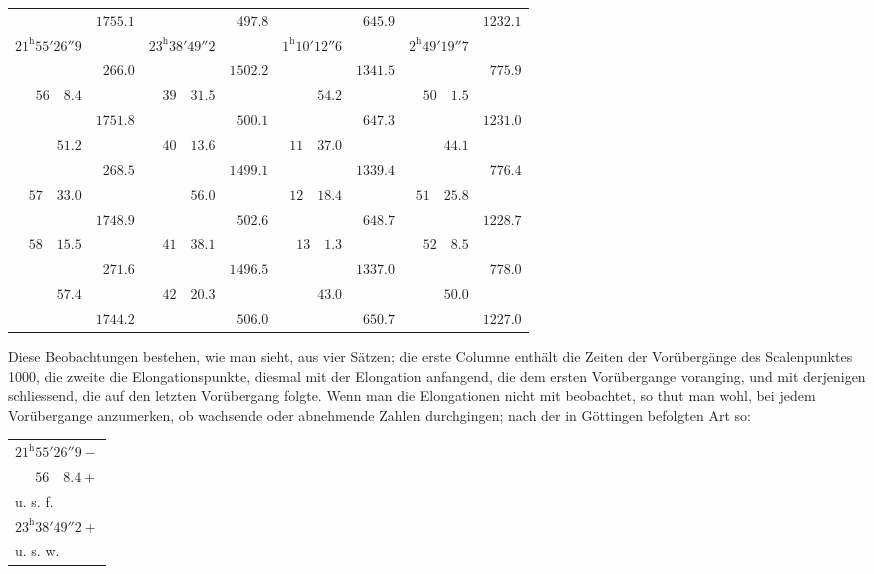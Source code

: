 \begin{center}
\begingroup\fontsize{9}{11}\selectfont\setlength{\tabcolsep}{2pt}
\begin{tabular}{r|r||r|r||r|r||r|r}
& $1755.1$ && $497.8$ && $645.9$ && $1232.1$ \\[-4pt]
$21^{\mathrm{h}}55'26''9$ && $23^{\mathrm{h}}38'49''2$ && $1^{\mathrm{h}}10'12''6$ && $2^{\mathrm{h}}49'19''7$ & \\[-4pt]
& $266.0$ && $1502.2$ && $1341.5$ && $775.9$ \\[-4pt]
$56\quad8.4$ && $39\quad31.5$ && $54.2$ && $50\quad1.5$ & \\[-4pt]
& $1751.8$ && $500.1$ && $647.3$ && $1231.0$ \\[-4pt]
$51.2$ && $40\quad13.6$ && $11\quad37.0$ && $44.1$ & \\[-4pt]
& $268.5$ && $1499.1$ && $1339.4$ && $776.4$ \\[-4pt]
$57\quad33.0$ && $56.0$ && $12\quad18.4$ && $51\quad25.8$ & \\[-4pt]
& $1748.9$ && $502.6$ && $648.7$ && $1228.7$ \\[-4pt]
$58\quad15.5$ && $41\quad38.1$ && $13\quad1.3$ && $52\quad8.5$ & \\[-4pt]
& $271.6$ && $1496.5$ && $1337.0$ && $778.0$ \\[-4pt]
$57.4$ && $42\quad20.3$ && $43.0$ && $50.0$ & \\[-4pt]
& $1744.2$ && $506.0$ && $650.7$ && $1227.0$
\end{tabular}\endgroup
\end{center}

Diese Beobachtungen bestehen, wie man sieht, aus vier Sätzen; die erste Columne enthält die Zeiten der Vorübergänge des Scalenpunktes 1000, die zweite die Elongationspunkte, diesmal mit der Elongation anfangend, die dem ersten Vorübergange voranging, und mit derjenigen schliessend, die auf den letzten Vorübergang folgte. Wenn man die Elongationen nicht mit beobachtet, so thut man wohl, bei jedem Vorübergange anzumerken, ob wachsende oder abnehmende Zahlen durchgingen; nach der in Göttingen befolgten Art so:
\begin{center}
\begin{tabular}{l}
$21^{\mathrm{h}}55'26''9-$ \\
$\phantom{21^{\mathrm{h}}}56\quad8.4+$ \\
u. s. f. \\
$23^{\mathrm{h}}38'49''2+$ \\
u. s. w.
\end{tabular}
\end{center}


